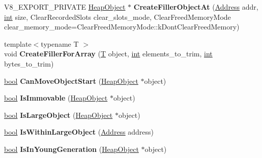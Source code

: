 \begin{DoxyCompactItemize}
V8\+\_\+\+E\+X\+P\+O\+R\+T\+\_\+\+P\+R\+I\+V\+A\+TE \mbox{\hyperlink{classv8_1_1internal_1_1HeapObject}{Heap\+Object}} $\ast$ {\bfseries Create\+Filler\+Object\+At} (\mbox{\hyperlink{classuintptr__t}{Address}} addr, \mbox{\hyperlink{classint}{int}} size, Clear\+Recorded\+Slots clear\+\_\+slots\+\_\+mode, Clear\+Freed\+Memory\+Mode clear\+\_\+memory\+\_\+mode=Clear\+Freed\+Memory\+Mode\+::k\+Dont\+Clear\+Freed\+Memory)
\item 
\mbox{\label{classv8_1_1internal_1_1Heap_aeda7071ec4e6557767e7da75e7f4e22d}} 
{\footnotesize template$<$typename T $>$ }\\void {\bfseries Create\+Filler\+For\+Array} (\mbox{\hyperlink{classv8_1_1internal_1_1torque_1_1T}{T}} object, \mbox{\hyperlink{classint}{int}} elements\+\_\+to\+\_\+trim, \mbox{\hyperlink{classint}{int}} bytes\+\_\+to\+\_\+trim)
\item 
\mbox{\label{classv8_1_1internal_1_1Heap_aae28212dc425926486e4efe38fb39fc8}} 
\mbox{\hyperlink{classbool}{bool}} {\bfseries Can\+Move\+Object\+Start} (\mbox{\hyperlink{classv8_1_1internal_1_1HeapObject}{Heap\+Object}} $\ast$object)
\item 
\mbox{\label{classv8_1_1internal_1_1Heap_a7f896d10749e806692bd3865f43affda}} 
\mbox{\hyperlink{classbool}{bool}} {\bfseries Is\+Immovable} (\mbox{\hyperlink{classv8_1_1internal_1_1HeapObject}{Heap\+Object}} $\ast$object)
\item 
\mbox{\label{classv8_1_1internal_1_1Heap_a5162b33f48cf8b3e5c7d72378b08b0ca}} 
\mbox{\hyperlink{classbool}{bool}} {\bfseries Is\+Large\+Object} (\mbox{\hyperlink{classv8_1_1internal_1_1HeapObject}{Heap\+Object}} $\ast$object)
\item 
\mbox{\label{classv8_1_1internal_1_1Heap_a5b51bba979dd06898564859d1b14d601}} 
\mbox{\hyperlink{classbool}{bool}} {\bfseries Is\+Within\+Large\+Object} (\mbox{\hyperlink{classuintptr__t}{Address}} address)
\item 
\mbox{\label{classv8_1_1internal_1_1Heap_a7418c10fca5e28d1741c66101574a545}} 
\mbox{\hyperlink{classbool}{bool}} {\bfseries Is\+In\+Young\+Generation} (\mbox{\hyperlink{classv8_1_1internal_1_1HeapObject}{Heap\+Object}} $\ast$object)

\end{DoxyCompactItemize}
